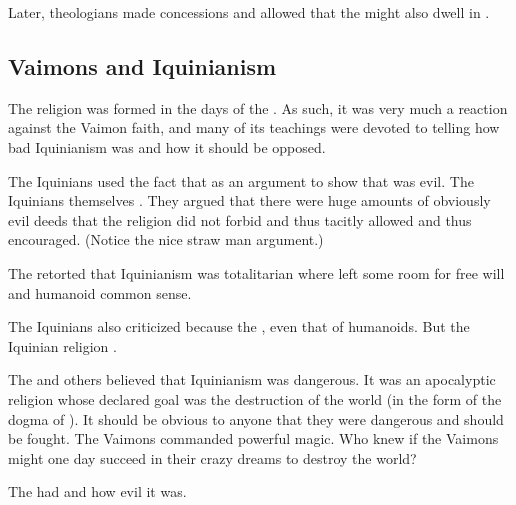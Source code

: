 Later, theologians made concessions and allowed that the \Primordials might also dwell in \humans.









\subsection{Vaimons and Iquinianism}
The \Ortaican religion was formed in the days of the \VaimonCaliphate. 
As such, it was very much a reaction against the Vaimon faith, and many of its teachings were devoted to telling how bad Iquinianism was and how it should be opposed.

The Iquinians used the fact that  as an argument to show that \Ortaicanism was evil.
The Iquinians themselves .
They argued that there were huge amounts of obviously evil deeds that the religion did not forbid and thus tacitly allowed and thus encouraged.
(Notice the nice straw man argument.)

The \Ortaicans retorted that Iquinianism was totalitarian where \Ortaicanism left some room for free will and humanoid common sense. 

The Iquinians also criticized \Ortaica because the \Ortaicans {}, even that of humanoids.
But the Iquinian religion . 

The \rethyaxes and others believed that Iquinianism was dangerous.
It was an apocalyptic religion whose declared goal was the destruction of the world (in the form of the dogma of ).
It should be obvious to anyone that they were dangerous and should be fought.
The Vaimons commanded powerful magic. 
Who knew if the Vaimons might one day succeed in their crazy dreams to destroy the world?

The \Ortaicans had  and how evil it was. 















